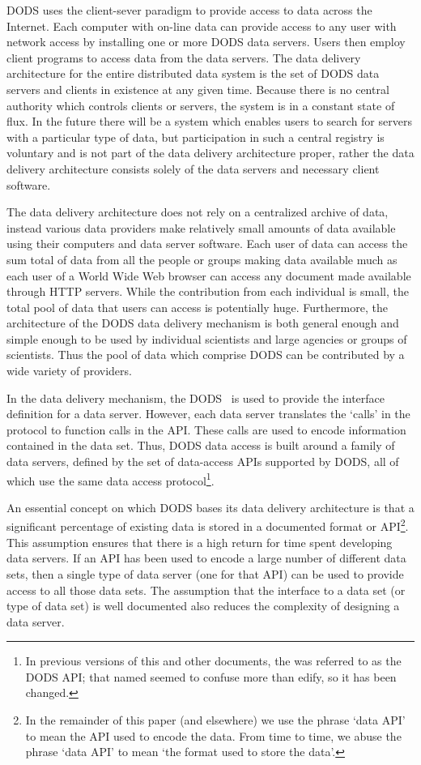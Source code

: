 DODS uses the client-sever paradigm to provide access to data across the
Internet. Each computer with on-line data can provide access to any user with
network access by installing one or more DODS data servers.  Users then
employ client programs to access data from the data servers. The data
delivery architecture for the entire distributed data system is the set of
DODS data servers and clients in existence at any given time. Because there
is no central authority which controls clients or servers, the system is in a
constant state of flux. In the future there will be a system which enables
users to search for servers with a particular type of data, but participation
in such a central registry is voluntary and is not part of the data delivery
architecture proper, rather the data delivery architecture consists solely of
the data servers and necessary client software.

The data delivery architecture does not rely on a centralized archive of
data, instead various data providers make relatively small amounts of data
available using their computers and data server software. Each user of data
can access the sum total of data from all the people or groups making data
available much as each user of a World Wide Web browser can access any
document made available through HTTP servers. While the contribution from
each individual is small, the total pool of data that users can access is
potentially huge.  Furthermore, the architecture of the DODS data delivery
mechanism is both general enough and simple enough to be used by individual
scientists and large agencies or groups of scientists. Thus the pool of data
which comprise DODS can be contributed by a wide variety of providers.

In the data delivery mechanism, the DODS \dap\ is used to provide the
interface definition for a data server. However, each data server translates
the `calls' in the protocol to function calls in the API\@. These calls are
used to encode information contained in the data set.  Thus, DODS data access
is built around a family of data servers, defined by the set of data-access
APIs supported by DODS, all of which use the same data access
protocol\footnote{In previous versions of this and other documents, the \dap
was referred to as the DODS API; that named seemed to confuse more than
edify, so it has been changed.}.

An essential concept on which DODS bases its data delivery architecture is
that a significant percentage of existing data is stored in a documented
format or API\footnote{In the remainder of this paper (and elsewhere) we use
  the phrase `data API' to mean the API used to encode the data. From time to
  time, we abuse the phrase `data API' to mean `the format used to store the
  data'.}. This assumption ensures that there is a high return for time spent
developing data servers. If an API has been used to encode a large number of
different data sets, then a single type of data server (one for that API) can
be used to provide access to all those data sets. The assumption that the
interface to a data set (or type of data set) is well documented also reduces
the complexity of designing a data server.

